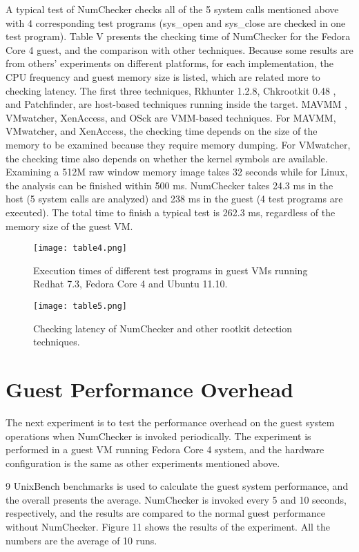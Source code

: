 \documentclass[12pt]{report}
\begin{document}
A typical test of NumChecker checks all of the 5 system
calls mentioned above with 4 corresponding test programs
(sys\_open and sys\_close are checked in one test program).
Table V presents the checking time of NumChecker for the Fedora
Core 4 guest, and the comparison with other techniques.
Because some results are from others’ experiments on different
platforms, for each implementation, the CPU frequency
and guest memory size is listed, which are related more to checking
latency. The first three techniques, Rkhunter 1.2.8, Chkrootkit
0.48 , and Patchfinder, are host-based techniques running
inside the target. MAVMM , VMwatcher, XenAccess,
and OSck  are VMM-based techniques. For MAVMM,
VMwatcher, and XenAccess, the checking time depends on
the size of the memory to be examined because they require
memory dumping. For VMwatcher, the checking time also depends
on whether the kernel symbols are available. Examining
a 512M raw window memory image takes 32 seconds while
for Linux, the analysis can be finished within 500 ms.
NumChecker takes 24.3 ms in the host (5 system calls
are analyzed) and 238 ms in the guest (4 test programs are
executed). The total time to finish a typical test is 262.3 ms,
regardless of the memory size of the guest VM.

\begin{figure}[h]
\centering
\texttt{[image: table4.png]}
\caption{Execution times of different test programs in guest VMs
running Redhat 7.3, Fedora Core 4 and Ubuntu 11.10.}
\end{figure}

\begin{figure}[h]
\centering
\texttt{[image: table5.png]}
\caption{Checking latency of NumChecker and other rootkit
detection techniques. }
\end{figure}

\section{Guest Performance Overhead}
The next experiment is to test the performance overhead
on the guest system operations when NumChecker is invoked
periodically. The experiment is performed in a guest VM
running Fedora Core 4 system, and the hardware configuration
is the same as other experiments mentioned above.

 9 UnixBench benchmarks is used to calculate the guest
system performance, and the overall presents the average.
NumChecker is invoked every 5 and 10 seconds, respectively,
and the results are compared to the normal guest performance
without NumChecker. Figure 11 shows the results of the
experiment. All the numbers are the average of 10 runs.
\end{document}
